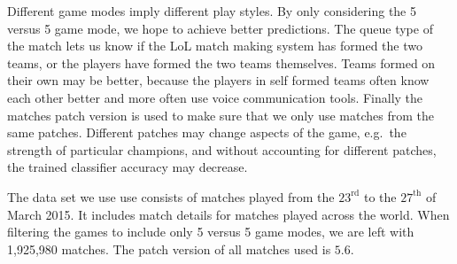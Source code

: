 Different game modes imply different play styles. By only considering the 5 versus 5 game mode, we hope to achieve better predictions.
The queue type of the match lets us know if the LoL match making system has formed the two teams, or the players have formed the two teams themselves.
Teams formed on their own may be better, because the players in self formed teams often know each other better and more often use voice communication tools.
Finally the matches patch version is used to make sure that we only use matches from the same patches. Different patches may change aspects of the game, e.g.\ the strength of particular champions, and without accounting for different patches, the trained classifier accuracy may decrease.  

The data set we use use consists of matches played from the $23^{\text{rd}}$ to the $27^{\text{th}}$ of March 2015. It includes match details for matches played across the world. When filtering the games to include only 5 versus 5 game modes, we are left with 1,925,980 matches. The patch version of all matches used is $5.6$.


